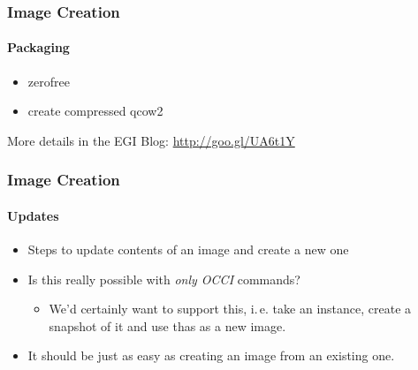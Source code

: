 \begin{frame}
\frametitle{Image Creation}
\framesubtitle{Packaging}
\begin{itemize}
\item zerofree
\item create compressed qcow2
\end{itemize}
More details in the EGI Blog: \url{http://goo.gl/UA6t1Y}
\end{frame}


\begin{frame}
\frametitle{Image Creation}
\framesubtitle{Updates}
\begin{itemize}
\item Steps to update contents of an image and create a new one
\item Is this really possible with \emph{only OCCI} commands?
  \begin{itemize}
  \item We'd certainly want to support this, i.\,e. take an instance,
    create a snapshot of it and use thas as a new image.
  \end{itemize}
\item It should be just as easy as creating an image from an existing one.
\end{itemize}
\end{frame}
